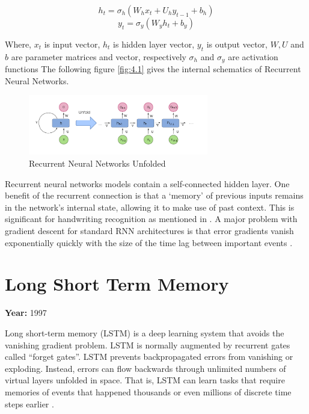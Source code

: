\documentclass[12pt, a4paper]{report}
\begin{document}
\[h_t = \sigma_h(W_h x_t + U_h y_{t-1} + b_h)\]
\begin{equation}
    \label{equ:4.1}
    y_t = \sigma_y(W_y h_t + b_y)
\end{equation}

Where, $x_t$ is input vector, $h_t$ is hidden layer vector, $y_t$ is output vector, $W, U$ and $b$ are parameter matrices and vector, respectively $\sigma_h$ and $\sigma_y$ are activation functions The following figure \eqref{fig:4.1} gives the internal schematics of Recurrent Neural Networks.

\begin{figure}[!htbp]
    \centering
    \includegraphics[width=0.7\textwidth]{Recurrent_neural_network_unfold.png}
    \caption[Recurrent Neural Networks Unfolded]{Recurrent Neural Networks Unfolded \cite{wiki:rnns}}
    \label{fig:4.1}
\end{figure}

Recurrent neural networks models contain a self-connected hidden layer. One benefit of the recurrent connection is that a `memory' of previous inputs remains in the network’s internal state, allowing it to make use of past context. This is significant for handwriting recognition as mentioned in \cite{art:ieee:consys}. A major problem with gradient descent for standard RNN architectures is that error gradients vanish exponentially quickly with the size of the time lag between important events \cite{wiki:rnns}.

\section{Long Short Term Memory}
\label{sec:lstm}

\textbf{Year:} 1997

Long short-term memory (LSTM) is a deep learning system that avoids the vanishing gradient problem. LSTM is normally augmented by recurrent gates called ``forget gates''. LSTM prevents backpropagated errors from vanishing or exploding. Instead, errors can flow backwards through unlimited numbers of virtual layers unfolded in space. That is, LSTM can learn tasks that require memories of events that happened thousands or even millions of discrete time steps earlier \cite{wiki:rnns}.
\end{document}
